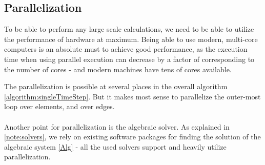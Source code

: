 \subsection{Parallelization}
\label{section:parallel}
To be able to perform any large scale calculations, we need to be able to utilize the performance of hardware at maximum. Being able to use modern, multi-core computers is an absolute must to achieve good performance, as the execution time when using parallel execution can decrease by a factor of corresponding to the number of cores - and modern machines have tens of cores available.

The parallelization is possible at several places in the overall algorithm \ref{algorithm:singleTimeStep}. But it makes most sense to parallelize the outer-most loop over elements, and over edges.

\paragraph{}
Another point for parallelization is the algebraic solver. As explained in \ref{note:solvers}, we rely on existing software packages for finding the solution of the algebraic system \ref{Alg} - all the used solvers support and heavily utilize parallelization.